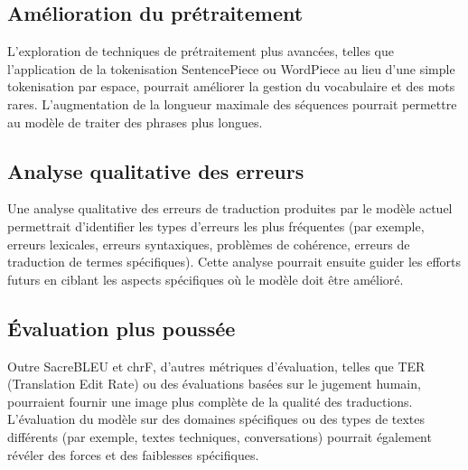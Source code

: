 \documentclass[11pt,a4paper]{article}
\begin{document}
\subsection{Amélioration du prétraitement}
L'exploration de techniques de prétraitement plus avancées, telles que l'application de la tokenisation SentencePiece\citep{Kudo2018Sentencepiece} ou WordPiece\citep{Wu2019Googles} au lieu d'une simple tokenisation par espace, pourrait améliorer la gestion du vocabulaire et des mots rares. L'augmentation de la longueur maximale des séquences pourrait permettre au modèle de traiter des phrases plus longues.

\subsection{Analyse qualitative des erreurs}
Une analyse qualitative des erreurs de traduction produites par le modèle actuel permettrait d'identifier les types d'erreurs les plus fréquentes (par exemple, erreurs lexicales, erreurs syntaxiques, problèmes de cohérence, erreurs de traduction de termes spécifiques). Cette analyse pourrait ensuite guider les efforts futurs en ciblant les aspects spécifiques où le modèle doit être amélioré.
\clearpage
\subsection{Évaluation plus poussée}
Outre SacreBLEU et chrF, d'autres métriques d'évaluation, telles que TER (Translation Edit Rate) ou des évaluations basées sur le jugement humain, pourraient fournir une image plus complète de la qualité des traductions. L'évaluation du modèle sur des domaines spécifiques ou des types de textes différents (par exemple, textes techniques, conversations) pourrait également révéler des forces et des faiblesses spécifiques.
\nocite{*}


\clearpage
\tableofcontents
\end{document}
